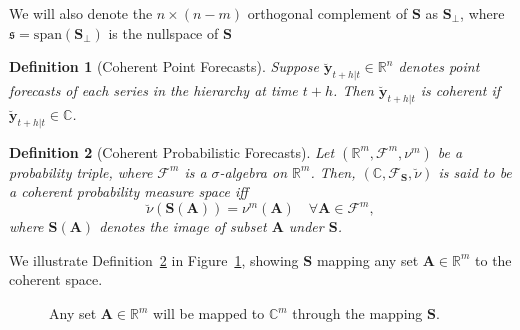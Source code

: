 \documentclass[a4paper, 11pt]{article}
\newtheorem{definition}{Definition}[section]
\begin{document}
We will also denote the $n\times(n-m)$ orthogonal complement of $\bm{S}$ as $\bm{S}_{\perp}$, where $\mathfrak{s}=\mbox{span}\left(\bm{S}_{\perp}\right)$ is the nullspace of $\bm{S}$

\begin{definition}[Coherent Point Forecasts]\label{def:cohpoint}
  Suppose $\breve{\bm{y}}_{t+h|t} \in \mathbb{R}^n$ denotes point forecasts of each series in the hierarchy at time $t+h$.  Then $\breve{\bm{y}}_{t+h|t}$ is \emph{coherent} if $\breve{\bm{y}}_{t+h|t} \in \mathbb{C}$. 
\end{definition}

\begin{definition}[Coherent Probabilistic Forecasts]\label{def:cohprob}
  Let $(\mathbb{R}^m, \bm{\mathscr{F}}^m, \nu^m)$ be a probability triple, where $\mathscr{F}^m$ is a $\sigma$-algebra on $\mathbb{R}^m$. Then, $(\mathbb{C}, \mathscr{F}_{\bm{S}}, \breve{\nu})$ is said to be a coherent probability measure space iff
  $$
      \breve{\nu}(\bm{S}(\bm{A})) = \nu^m(\bm{A}) \quad \forall  \bm{A} \in \mathscr{F}^m,
    $$ 
  where $\bm{S}(\bm{A})$ denotes the image of subset $\bm{A}$ under $\bm{S}$. 
\end{definition}

We illustrate Definition~\ref{def:cohprob} in Figure~\ref{fig2}, showing $\bm{S}$ mapping any set $\bm{A}\in\mathbb{R}^m$ to the coherent space.

\begin{figure}[H]
  \begin{center}
    \newline
  \end{center}
  \caption{Any set $\bm{A} \in \mathbb{R}^m$ will be mapped to $\mathbb{C}^m$ through the mapping $\bm{S}$.}\label{fig2}
\end{figure}
\end{document}
